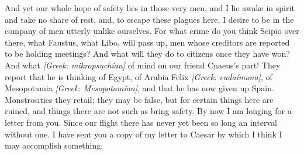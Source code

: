 And yet our whole hope of safety lies in those very men, and I lie awake in spirit and take no share of rest, and, to escape these plagues here, I desire to be in the company of men utterly unlike ourselves. For what crime do you think Scipio over there, what Faustus, what Libo, will pass up, men whose creditors are reported to be holding meetings? And what will they do to citizens once they have won? And what \textit{[Greek: mikropsuch\'ian]} of mind on our friend Cnaeus's part! They report that he is thinking of Egypt, of Arabia Felix \textit{[Greek: euda\'imona]}, of Mesopotamia \textit{[Greek: Mesopotam\'ian]}, and that he has now given up Spain. Monstrosities they retail; they may be false, but for certain things here are ruined, and things there are not such as bring safety. By now I am longing for a letter from you. Since our flight there has never yet been so long an interval without one. I have sent you a copy of my letter to Caesar by which I think I may accomplish something.
